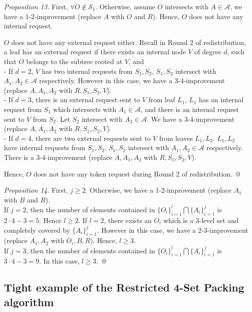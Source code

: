 \documentclass[runningheads,a4paper]{llncs}
\numberwithin{equation}{section}
\begin{document}
\begin{proof}[Proposition 13]
First, $\forall O\notin\mathscr{S}_1$. Otherwise, assume $O$ intersects with $A\in\mathscr{A}$, we have a 1-2-improvement (replace $A$ with $O$ and $R$). Hence, $O$ does not have any internal request.

$O$ does not have any external request either. Recall in Round 2 of redistribution, a leaf has an external request if there exists an internal node $V$ of degree $d$, such that $O$ belongs to the subtree rooted at $V$, and \\
- If $d=2$, $V$ has two internal requests from $S_1,S_2$, $S_1,S_2$ intersect with $A_1,A_2\in\mathscr{A}$ respectively. However in this case, we have a 3-4-improvement (replace $A,A_1,A_2$ with $R,S_1,S_2,V$).\\
- If $d=3$, there is an external request sent to $V$ from leaf $L_1$, $L_1$ has an internal request from $S_1$ which intersects with $A_1\in\mathscr{A}$, and there is an internal request sent to $V$ from $S_2$. Let $S_2$ intersect with $A_2\in\mathscr{A}$. We have a 3-4-improvement (replace $A,A_1,A_2$ with $R,S_1,S_2,V$). \\
- If $d=4$, there are two external requests sent to $V$ from leaves $L_1,L_2$. $L_1,L_2$ have internal requests from $S_1,S_2$. $S_1,S_2$ intersect with $A_1,A_2\in\mathscr{A}$ respectively. There is a 3-4-improvement (replace $A,A_1,A_2$ with $R,S_1,S_2,V$).

Hence, $O$ does not have any token request during Round 2 of redistribution. \qed
\end{proof}


\begin{proof}[Proposition 14]
First, $j\geq 2$. Otherwise, we have a 1-2-improvement (replace $A_1$ with $B$ and $R$).  \\
If $j=2$, then the number of elements contained in
$\{O_i\}_{i=1}^l\bigcap\{A_i\}_{i=1}^j$ is $2\cdot 4-3=5$. Hence $l\geq 2$. If $l=2$, there exists an $O_i$ which is a 3-level set and completely covered by $\{A_i\}_{i=1}^j$. However in this case, we have a 2-3-improvement (replace $A_1,A_2$ with $O_i,B,R$). Hence, $l\geq 3$. \\
If $j=3$, then the number of elements contained in
$\{O_i\}_{i=1}^l\bigcap\{A_i\}_{i=1}^j$ is $3\cdot 4-3=9$. In this case, $l\geq 3$.  \qed
\end{proof}

\subsection{Tight example of the Restricted 4-Set Packing algorithm}
\end{document}
